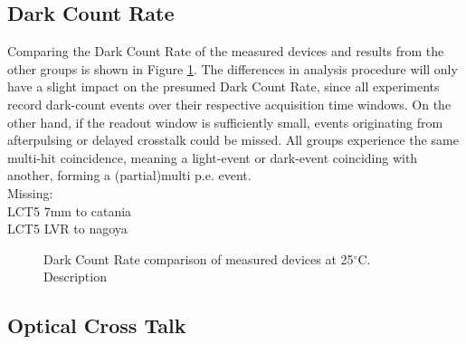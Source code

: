 \documentclass[12pt,article,type=msc,colorback,accentcolor=tud9c]{tudthesis}
\begin{document}
\subsection{Dark Count Rate}
\label{subsec:DC_DCR}

Comparing the Dark Count Rate of the measured devices and results from the other groups is shown in Figure \ref{fig:DC_DCR}. The differences in analysis procedure will only have a slight impact on the presumed Dark Count Rate, since all experiments record dark-count events over their respective acquisition time windows. On the other hand, if the readout window is sufficiently small, events originating from afterpulsing or delayed crosstalk could be missed. All groups experience the same multi-hit coincidence, meaning a light-event or dark-event coinciding with another, forming a (partial)multi p.e. event.
\\
Missing:\\
LCT5 7mm to catania\\
LCT5 LVR to nagoya\\


\begin{figure}%
\begin{centering}
\caption{Dark Count Rate comparison of measured devices at 25$^\circ$C. Description}
\label{fig:DC_DCR}
\end{centering}
\end{figure}

\subsection{Optical Cross Talk}
\label{subsec:DC_OCT}
\end{document}
